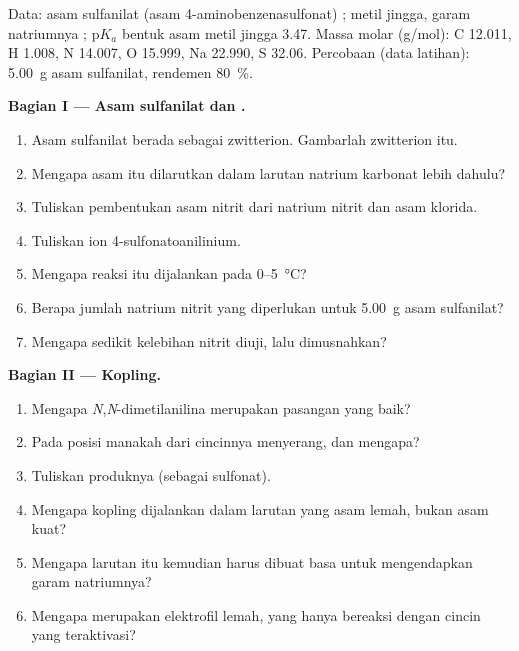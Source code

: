 \begin{problem}
\label{pb:b2:amines:1}
Data: asam sulfanilat (asam 4-aminobenzenasulfonat) ; metil
jingga, garam natriumnya
; $\mathrm pK_a$ bentuk asam metil jingga 3.47. Massa molar
(\unit{g/mol}): C 12.011, H 1.008, N 14.007, O 15.999, Na 22.990, S 32.06.
Percobaan (data latihan): \qty{5.00}{g} asam sulfanilat, rendemen 80~\%.

\medskip
\noindent\textbf{Bagian I --- Asam sulfanilat dan .}
\begin{enumerate}
  \item Asam sulfanilat berada sebagai zwitterion. Gambarlah zwitterion itu.
  \item Mengapa asam itu dilarutkan dalam larutan natrium karbonat lebih dahulu?
  \item Tuliskan pembentukan asam nitrit dari natrium nitrit dan asam klorida.
  \item Tuliskan  ion 4-sulfonatoanilinium.
  \item Mengapa reaksi itu dijalankan pada 0--\qty{5}{\degreeCelsius}?
  \item Berapa jumlah natrium nitrit yang diperlukan untuk \qty{5.00}{g}
        asam sulfanilat?
  \item Mengapa sedikit kelebihan nitrit diuji, lalu dimusnahkan?
\end{enumerate}

\medskip
\noindent\textbf{Bagian II --- Kopling.}
\begin{enumerate}[resume]
  \item Mengapa \textit{N},\textit{N}-dimetilanilina merupakan pasangan yang baik?
  \item Pada posisi manakah dari cincinnya  menyerang, dan mengapa?
  \item Tuliskan produknya (sebagai sulfonat).
  \item Mengapa kopling dijalankan dalam larutan yang asam lemah, bukan asam kuat?
  \item Mengapa larutan itu kemudian harus dibuat basa untuk mengendapkan
        garam natriumnya?
  \item Mengapa  merupakan elektrofil lemah, yang hanya
        bereaksi dengan cincin yang teraktivasi?
\end{enumerate}


\end{problem}
